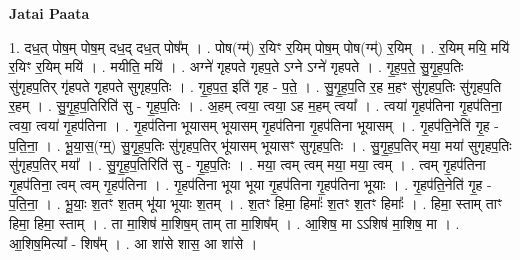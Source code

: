 \documentclass[17pt]{extarticle}
\begin{document}
\textbf{Jatai Paata} \newline

1. दध॒त् पोष॒म् पोष॒म् दध॒द् दध॒त् पोष᳚म् । . पोष(ग्म्॑) र॒यिꣳ र॒यिम् पोष॒म् पोष(ग्म्॑) र॒यिम् । . र॒यिम् मयि॒ मयि॑ र॒यिꣳ र॒यिम् मयि॑ । . मयीति॒ मयि॑ । . अग्ने॑ गृहपते गृहप॒ते ऽग्ने ऽग्ने॑ गृहपते । . गृ॒ह॒प॒ते॒ सु॒गृ॒ह॒प॒तिः सु॑गृहप॒तिर् गृ॑हपते गृहपते सुगृहप॒तिः । . गृ॒ह॒प॒त॒ इति॑ गृह - प॒ते॒ । . सु॒गृ॒ह॒प॒ति र॒ह म॒हꣳ सु॑गृहप॒तिः सु॑गृहप॒ति र॒हम् । . सु॒गृ॒ह॒प॒तिरिति॑ सु - गृ॒ह॒प॒तिः । . अ॒हम् त्वया॒ त्वया॒ ऽह म॒हम् त्वया᳚ । . त्वया॑ गृ॒हप॑तिना गृ॒हप॑तिना॒ त्वया॒ त्वया॑ गृ॒हप॑तिना । . गृ॒हप॑तिना भूयासम् भूयासम् गृ॒हप॑तिना गृ॒हप॑तिना भूयासम् । . गृ॒हप॑ति॒नेति॑ गृ॒ह - प॒ति॒ना॒ । . भू॒या॒स॒(ग्म्॒) सु॒गृ॒ह॒प॒तिः सु॑गृहप॒तिर् भू॑यासम् भूयासꣳ सुगृहप॒तिः । . सु॒गृ॒ह॒प॒तिर् मया॒ मया॑ सुगृहप॒तिः सु॑गृहप॒तिर् मया᳚ । . सु॒गृ॒ह॒प॒तिरिति॑ सु - गृ॒ह॒प॒तिः । . मया॒ त्वम् त्वम् मया॒ मया॒ त्वम् । . त्वम् गृ॒हप॑तिना गृ॒हप॑तिना॒ त्वम् त्वम् गृ॒हप॑तिना । . गृ॒हप॑तिना भूया भूया गृ॒हप॑तिना गृ॒हप॑तिना भूयाः । . गृ॒हप॑ति॒नेति॑ गृ॒ह - प॒ति॒ना॒ । . भू॒याः॒ श॒तꣳ श॒तम् भू॑या भूयाः श॒तम् । . श॒तꣳ हिमा॒ हिमाः᳚ श॒तꣳ श॒तꣳ हिमाः᳚ । . हिमा॒ स्ताम् ताꣳ हिमा॒ हिमा॒ स्ताम् । . ता मा॒शिष॑ मा॒शिष॒म् ताम् ता मा॒शिष᳚म् । . आ॒शिष॒ मा ऽऽशिष॑ मा॒शिष॒ मा । . आ॒शिष॒मित्या᳚ - शिष᳚म् । . आ शा॑से शास॒ आ शा॑से । \newline
\end{document}
